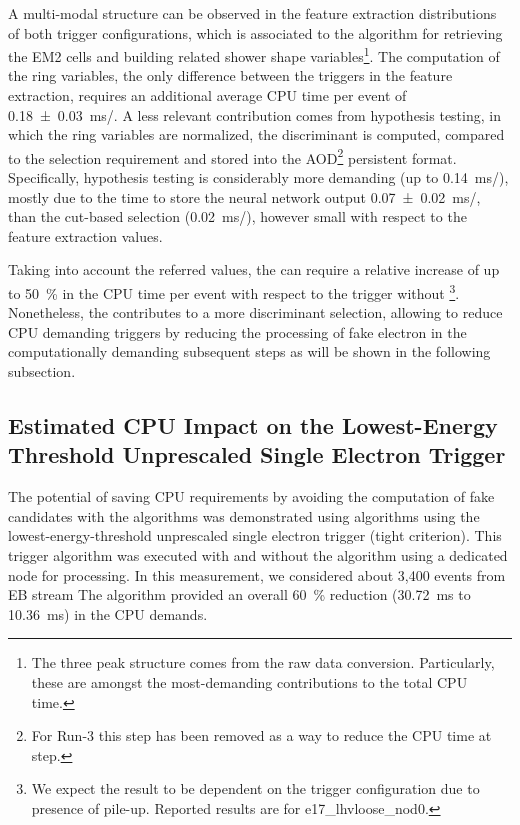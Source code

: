 A multi-modal structure can be observed in the feature extraction distributions
of both trigger configurations, which is associated to the algorithm
for retrieving the EM2 cells and building related shower shape
variables\footnote{The three peak structure comes from the raw data conversion.
	Particularly, these are amongst the most-demanding contributions to
	the \fastcalo total CPU time.}. The computation of the ring variables, the only difference between the
triggers in the \fastcalo feature extraction, requires an additional average CPU time per
event of \SI{0.18 \pm 0.03}{\ms/}. 
A less relevant contribution
comes from hypothesis testing, in which the ring variables are normalized, the
discriminant is computed, compared to the selection requirement and stored into
the AOD\footnote{For Run-3 this step has been removed as a way to reduce the CPU time at \fastcalo step.} persistent format. 
Specifically, \rnn{} hypothesis testing is considerably more demanding
(up to \SI{0.14}{\ms/}), mostly due to the time 
to store the neural network output \SI{0.07 \pm 0.02}{\ms/}, 
than the cut-based selection
(\SI{0.02}{\ms/}), however small with respect to the feature
extraction values. 


Taking into account the referred values, the \rnn{} can require a
relative increase of up to \SI{50}{\%} in the \fastcalo{} CPU time per event
with respect to the trigger without \rnn{}\footnote{We expect the result to be
	dependent on the trigger configuration due to presence of pile-up. Reported
	results are for e17\_lhvloose\_nod0.}. Nonetheless, the \rnn{} contributes to
a more discriminant selection, allowing to reduce CPU demanding triggers
by reducing the processing of fake electron in the computationally demanding
subsequent steps as will be shown in the following subsection.

\FloatBarrier
\subsection{Estimated CPU Impact on the Lowest-Energy Threshold Unprescaled Single Electron Trigger}\label{top:cpu_e26}

The potential of saving CPU requirements by
avoiding the computation of fake candidates with the \rnn algorithms was demonstrated using algorithms using the lowest-energy-threshold unprescaled single electron trigger
(tight criterion). This trigger algorithm was executed with
and without the \rnn{} algorithm using a dedicated node for processing.
In this measurement, we considered about 3,400 events from EB stream %
The \rnn{} algorithm provided an overall
\SI{60}{\%} reduction (\SI{30.72}{\milli\second} to \SI{10.36}{\milli\second})
in the CPU demands.


